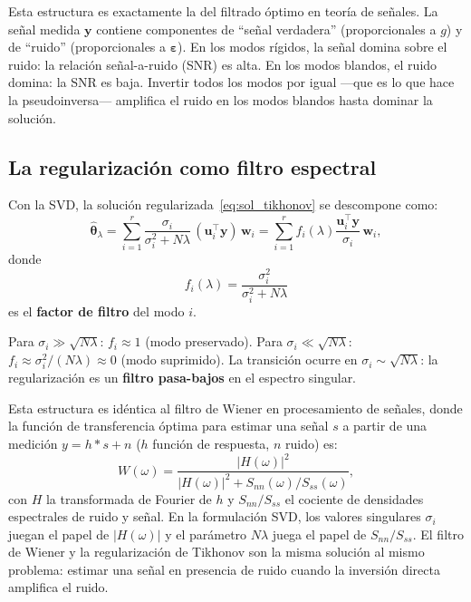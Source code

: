 Esta estructura es exactamente la del filtrado óptimo en teoría de
señales. La señal medida $\bm{y}$ contiene componentes de ``señal
verdadera'' (proporcionales a $g$) y de ``ruido'' (proporcionales a
$\bm{\varepsilon}$). En los modos rígidos, la señal domina sobre el
ruido: la relación señal-a-ruido (SNR) es alta. En los modos blandos,
el ruido domina: la SNR es baja. Invertir todos los modos por igual
—que es lo que hace la pseudoinversa— amplifica el ruido en los modos
blandos hasta dominar la solución.

\subsection{La regularización como filtro espectral}
\label{subsec:filtro_espectral}


Con la SVD, la solución regularizada~\eqref{eq:sol_tikhonov} se
descompone como:
\begin{equation}
  \hat{\bm{\theta}}_\lambda
  = \sum_{i=1}^r \frac{\sigma_i}{\sigma_i^2 + N\lambda}
  \,(\bm{u}_i^\top\bm{y})\,\bm{w}_i
  = \sum_{i=1}^r f_i(\lambda)
  \frac{\bm{u}_i^\top\bm{y}}{\sigma_i}\,\bm{w}_i,
  \label{eq:sol_tikh_svd}
\end{equation}
donde
\begin{equation}
  f_i(\lambda)
  = \frac{\sigma_i^2}{\sigma_i^2 + N\lambda}
  \label{eq:filtro}
\end{equation}
es el \textbf{factor de filtro} del modo $i$.

Para $\sigma_i \gg \sqrt{N\lambda}$: $f_i \approx 1$ (modo
preservado). Para $\sigma_i \ll \sqrt{N\lambda}$: $f_i \approx
\sigma_i^2/(N\lambda) \approx 0$ (modo suprimido). La transición
ocurre en $\sigma_i \sim \sqrt{N\lambda}$: la regularización es un
\textbf{filtro pasa-bajos} en el espectro singular.

Esta estructura es idéntica al filtro de Wiener en procesamiento de
señales, donde la función de transferencia óptima para estimar una
señal $s$ a partir de una medición $y = h * s + n$ ($h$ función de
respuesta, $n$ ruido) es:
\[
  W(\omega)
  = \frac{|H(\omega)|^2}{|H(\omega)|^2 + S_{nn}(\omega)/S_{ss}(\omega)},
\]
con $H$ la transformada de Fourier de $h$ y $S_{nn}/S_{ss}$ el cociente
de densidades espectrales de ruido y señal. En la formulación SVD, los
valores singulares $\sigma_i$ juegan el papel de $|H(\omega)|$ y el
parámetro $N\lambda$ juega el papel de $S_{nn}/S_{ss}$. El filtro de
Wiener y la regularización de Tikhonov son la misma solución al mismo
problema: estimar una señal en presencia de ruido cuando la inversión
directa amplifica el ruido.

